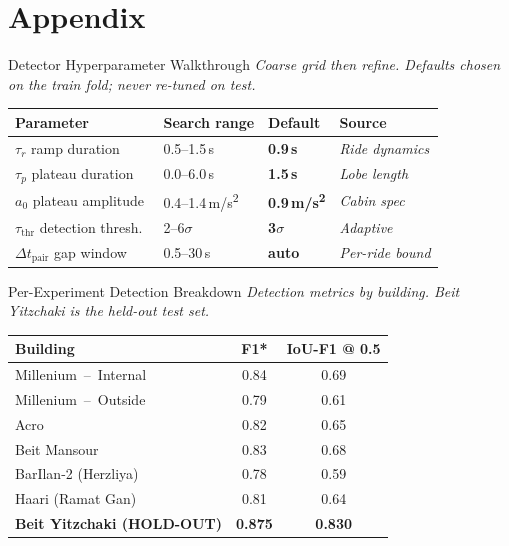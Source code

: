 \documentclass[aspectratio=169,11pt]{beamer}
\begin{document}
\section{Appendix}

\begin{frame}{Detector Hyperparameter Walkthrough}
\textit{Coarse grid then refine. Defaults chosen on the train fold; never re-tuned on test.}\par
\vspace{0.4cm}
\footnotesize
\begin{tabularx}{\linewidth}{@{}lXll@{}}
\toprule
\textbf{Parameter} & \textbf{Search range} & \textbf{Default} & \textbf{Source} \\
\midrule
$\tau_r$ ramp duration                & 0.5--1.5\,s        & \textcolor{pgcopper}{\textbf{0.9\,s}}  & \textit{Ride dynamics} \\
$\tau_p$ plateau duration             & 0.0--6.0\,s        & \textcolor{pgcopper}{\textbf{1.5\,s}}  & \textit{Lobe length} \\
$a_0$  plateau amplitude              & 0.4--1.4\,m/s\textsuperscript{2}  & \textcolor{pgcopper}{\textbf{0.9\,m/s\textsuperscript{2}}} & \textit{Cabin spec} \\
$\tau_{\mathrm{thr}}$ detection thresh.\ & 2--6$\sigma$    & \textcolor{pgcopper}{\textbf{3$\sigma$}} & \textit{Adaptive} \\
$\Delta t_{\mathrm{pair}}$ gap window  & 0.5--30\,s        & \textcolor{pgcopper}{\textbf{auto}}   & \textit{Per-ride bound} \\
\bottomrule
\end{tabularx}
\end{frame}


\begin{frame}{Per-Experiment Detection Breakdown}
\textit{Detection metrics by building. Beit Yitzchaki is the held-out test set.}\par
\vspace{0.4cm}
\footnotesize
\begin{tabularx}{\linewidth}{@{}Xcc@{}}
\toprule
\textbf{Building} & \textbf{F1*} & \textbf{IoU-F1 @ 0.5} \\
\midrule
Millenium\, --\, Internal              & 0.84  & 0.69  \\
Millenium\, --\, Outside               & 0.79  & 0.61  \\
Acro                                    & 0.82  & 0.65  \\
Beit Mansour                            & 0.83  & 0.68  \\
BarIlan-2 (Herzliya)                    & 0.78  & 0.59  \\
Haari (Ramat Gan)                       & 0.81  & 0.64  \\
\midrule
\textcolor{pgsage}{\textbf{Beit Yitzchaki  (HOLD-OUT)}}
   & \textcolor{pgsage}{\textbf{0.875}}
   & \textcolor{pgsage}{\textbf{0.830}} \\
\bottomrule
\end{tabularx}
\end{frame}
\end{document}

